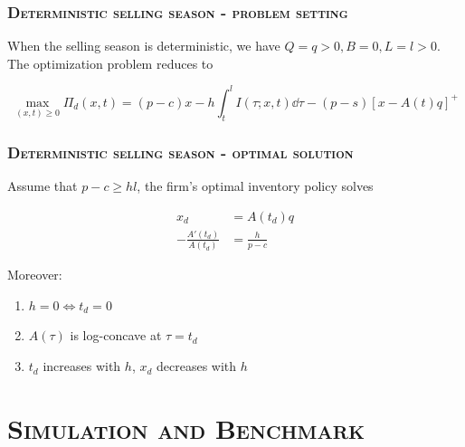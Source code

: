 \documentclass[aspectratio=169]{../presentation}
\begin{document}
    \begin{frame}
        \frametitle{\textsc{Deterministic selling season - problem setting}}

        When the selling season is deterministic, we have $Q = q > 0, B = 0, L = l > 0$. The optimization problem reduces to 

        \begin{equation}
            \max_{(x, t)\geq 0}\Pi_d(x, t) = (p-c)x - h\int_t^l I(\tau; x, t)\dd \tau - (p - s)\left[x - A(t)q\right]^+
            \label{eq:7}
        \end{equation}

    \end{frame}

    \begin{frame}
        \frametitle{\textsc{Deterministic selling season - optimal solution}}

        Assume that $p - c \geq hl$, the firm's optimal inventory policy solves

        \begin{align}
            x_d &= A\left(t_d\right)q \\
            -\frac{A'\left(t_d\right)}{A\left(t_d\right)} &= \frac{h}{p-c}
        \end{align}

        Moreover:

        \begin{enumerate}
            \item $h = 0\Leftrightarrow t_d = 0$
            \item $A(\tau)$ is log-concave at $\tau = t_d$
            \item $t_d$ increases with $h$, $x_d$ decreases with $h$
        \end{enumerate}

    \end{frame}

    \section{\textsc{Simulation and Benchmark}}
\end{document}
